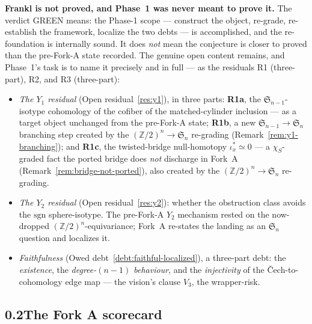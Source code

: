 \documentclass[11pt,oneside]{amsart}
\theoremstyle{plain}
\theoremstyle{definition}
\theoremstyle{remark}
\theoremstyle{honeststyle}
\newcommand{\sgn}{\mathrm{sgn}}
\newcommand{\Sym}{\mathfrak{S}}
\newcommand{\Z}{\mathbb{Z}}
\newcommand{\walsh}[1]{\chi_{#1}}
\begin{document}
\medskip\noindent
\textbf{Frankl is not proved, and Phase~1 was never meant to prove it.}
The verdict GREEN means: the Phase-1 scope --- construct the object,
re-grade, re-establish the framework, localize the two debts --- is
accomplished, and the re-foundation is internally sound. It does
\emph{not} mean the conjecture is closer to proved than the
pre-Fork-A state recorded. The genuine open content remains, and
Phase~1's task is to name it precisely and in full --- as the
residuals R1 (three-part), R2, and R3 (three-part):
\begin{itemize}[leftmargin=1.6em]
\item[\textbf{R1}] \emph{The $Y_1$ residual} (Open
  residual~\ref{res:y1}), in three parts: \textbf{R1a}, the
  $\Sym_{n-1}$-isotype cohomology of the cofiber of the
  matched-cylinder inclusion --- as a target object unchanged from the
  pre-Fork-A state; \textbf{R1b}, a new $\Sym_{n-1}\to\Sym_n$
  branching step created by the $(\Z/2)^n\to\Sym_n$ re-grading
  (Remark~\ref{rem:y1-branching}); and \textbf{R1c}, the
  twisted-bridge null-homotopy $\iota_x^{*}\simeq0$ --- a
  $\walsh{S}$-graded fact the ported bridge does \emph{not} discharge
  in Fork~A (Remark~\ref{rem:bridge-not-ported}), also created by the
  $(\Z/2)^n\to\Sym_n$ re-grading.
\item[\textbf{R2}] \emph{The $Y_2$ residual} (Open
  residual~\ref{res:y2}): whether the obstruction class avoids the
  $\sgn$ sphere-isotype. The pre-Fork-A $Y_2$ mechanism rested on the
  now-dropped $(\Z/2)^n$-equivariance; Fork~A re-states the landing as
  an $\Sym_n$ question and localizes it.
\item[\textbf{R3}] \emph{Faithfulness} (Owed
  debt~\ref{debt:faithful-localized}), a three-part debt: the
  \emph{existence}, the \emph{degree-$(n-1)$ behaviour}, and the
  \emph{injectivity} of the \v{C}ech-to-cohomology edge map --- the
  vision's clause $V_3$, the wrapper-risk.
\end{itemize}

\subsection*{0.2\quad The Fork A scorecard}
\end{document}
